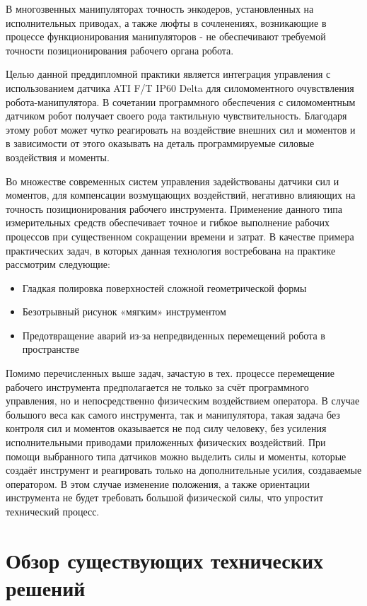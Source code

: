 \documentclass[a4paper,14pt,russian]{extreport} \usepackage{extsizes}
\begin{document}
	\tableofcontents
	\newpage
	В многозвенных манипуляторах точность энкодеров, установленных на исполнительных приводах, а также люфты в сочленениях, возникающие в процессе функционирования манипуляторов - не обеспечивают требуемой точности  позиционирования рабочего органа робота. 
	
	Целью данной преддипломной практики является интеграция управления с использованием датчика ATI F/T IP60 Delta для силомоментного очувствления робота-манипулятора. В сочетании программного обеспечения с силомоментным датчиком робот получает своего рода тактильную чувствительность. Благодаря этому робот может чутко реагировать на воздействие внешних сил и моментов и в зависимости от этого оказывать на деталь программируемые силовые воздействия и моменты.
	
	Во множестве современных систем управления  задействованы датчики сил и моментов, для компенсации возмущающих воздействий, негативно влияющих на точность позиционирования рабочего инструмента.  Применение данного типа измерительных средств обеспечивает точное и гибкое выполнение рабочих процессов при существенном сокращении времени и затрат. В качестве примера практических задач, в которых данная технология востребована на практике рассмотрим следующие:
	\begin{itemize} 
	\item{Гладкая полировка поверхностей сложной геометрической формы}
	\item{Безотрывный рисунок «мягким» инструментом}
	\item{Предотвращение аварий из-за непредвиденных перемещений робота в пространстве}
	\end{itemize}	 
	Помимо перечисленных выше задач, зачастую в тех. процессе перемещение рабочего инструмента предполагается не только за счёт программного управления, но и непосредственно физическим воздействием оператора. В случае большого веса как самого инструмента, так и манипулятора, такая задача без контроля сил и моментов оказывается не под силу человеку, без усиления исполнительными приводами приложенных физических воздействий. При помощи выбранного типа датчиков можно выделить силы и моменты, которые создаёт инструмент и реагировать только на дополнительные усилия, создаваемые оператором. В этом случае изменение положения, а также ориентации инструмента не будет требовать большой физической силы, что упростит технический процесс.
	\chapter {Обзор существующих технических решений}	
\end{document}
